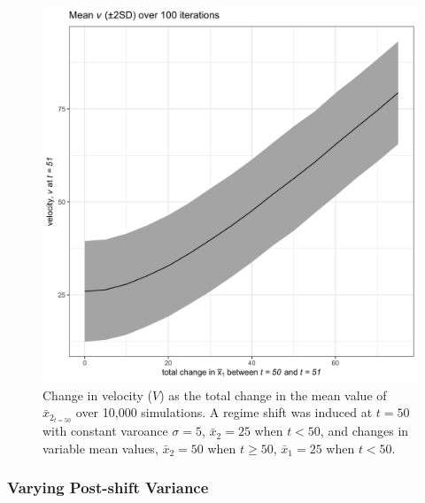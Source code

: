 \documentclass[print]{nuthesis}
\begin{document}
\begin{figure}
\includegraphics[width=0.85\linewidth]{./chapterFiles/velocity/figsCalledInDiss/simVplot2} \caption{Change in velocity ($V$) as the total change in the mean value of $\bar{x}_{2_{t=50}}$ over 10,000 simulations. A regime shift was induced at $t=50$ with constant varoance $\sigma = 5$, $\bar{x}_2 = 25$ when $t<50$,  and changes in variable mean values, $\bar{x}_2 = 50$ when $t \geq 50$, $\bar{x}_1 = 25$ when $t<50$.}\label{fig:simVplot2}
\end{figure}
\hypertarget{varying-post-shift-variance}{%
\subsubsection{Varying Post-shift Variance}\label{varying-post-shift-variance}}
\end{document}
